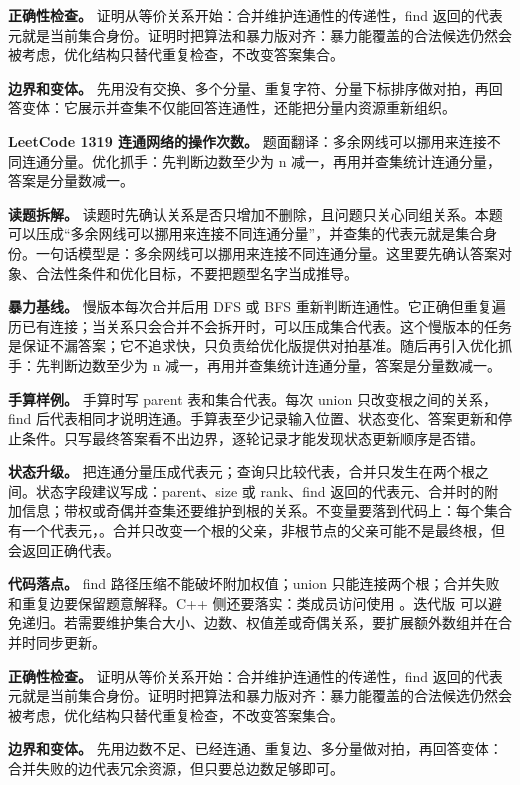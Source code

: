 \textbf{正确性检查。} 证明从等价关系开始：合并维护连通性的传递性，find 返回的代表元就是当前集合身份。证明时把算法和暴力版对齐：暴力能覆盖的合法候选仍然会被考虑，优化结构只替代重复检查，不改变答案集合。

\textbf{边界和变体。} 先用没有交换、多个分量、重复字符、分量下标排序做对拍，再回答变体：它展示并查集不仅能回答连通性，还能把分量内资源重新组织。

\noindent\textbf{LeetCode 1319 连通网络的操作次数。} 题面翻译：多余网线可以挪用来连接不同连通分量。优化抓手：先判断边数至少为 n 减一，再用并查集统计连通分量，答案是分量数减一。

\textbf{读题拆解。} 读题时先确认关系是否只增加不删除，且问题只关心同组关系。本题可以压成“多余网线可以挪用来连接不同连通分量”，并查集的代表元就是集合身份。一句话模型是：多余网线可以挪用来连接不同连通分量。这里要先确认答案对象、合法性条件和优化目标，不要把题型名字当成推导。

\textbf{暴力基线。} 慢版本每次合并后用 DFS 或 BFS 重新判断连通性。它正确但重复遍历已有连接；当关系只会合并不会拆开时，可以压成集合代表。这个慢版本的任务是保证不漏答案；它不追求快，只负责给优化版提供对拍基准。随后再引入优化抓手：先判断边数至少为 n 减一，再用并查集统计连通分量，答案是分量数减一。

\textbf{手算样例。} 手算时写 parent 表和集合代表。每次 union 只改变根之间的关系，find 后代表相同才说明连通。手算表至少记录输入位置、状态变化、答案更新和停止条件。只写最终答案看不出边界，逐轮记录才能发现状态更新顺序是否错。

\textbf{状态升级。} 把连通分量压成代表元；查询只比较代表，合并只发生在两个根之间。状态字段建议写成：parent、size 或 rank、find 返回的代表元、合并时的附加信息；带权或奇偶并查集还要维护到根的关系。不变量要落到代码上：每个集合有一个代表元，。合并只改变一个根的父亲，非根节点的父亲可能不是最终根，但  会返回正确代表。

\textbf{代码落点。} find 路径压缩不能破坏附加权值；union 只能连接两个根；合并失败和重复边要保留题意解释。C++ 侧还要落实：类成员访问使用 。迭代版  可以避免递归。若需要维护集合大小、边数、权值差或奇偶关系，要扩展额外数组并在合并时同步更新。

\textbf{正确性检查。} 证明从等价关系开始：合并维护连通性的传递性，find 返回的代表元就是当前集合身份。证明时把算法和暴力版对齐：暴力能覆盖的合法候选仍然会被考虑，优化结构只替代重复检查，不改变答案集合。

\textbf{边界和变体。} 先用边数不足、已经连通、重复边、多分量做对拍，再回答变体：合并失败的边代表冗余资源，但只要总边数足够即可。


